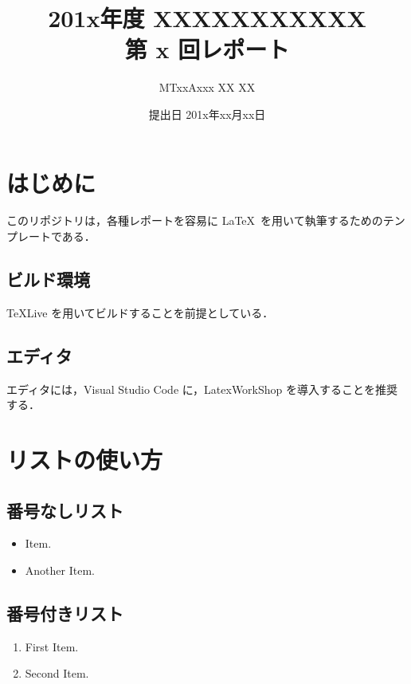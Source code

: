 \documentclass[a4j]{jsarticle}
\title{
    \vspace{-25mm}
    201x年度 XXXXXXXXXXX\\第 x 回レポート
}
\author{MTxxAxxx XX XX}
\date{提出日 201x年xx月xx日}
\begin{document}
\setcounter{page}{1}
\maketitle

\section{はじめに}
\label{cha:intro}
このリポジトリは，各種レポートを容易に \LaTeX\ を用いて執筆するためのテンプレートである．

\subsection{ビルド環境}
TeXLive \cite{TeXLive} を用いてビルドすることを前提としている．

\subsection{エディタ}
エディタには，Visual Studio Code \cite{VSCode} に，LatexWorkShop \cite{LaTeX-Workshop} を導入することを推奨する．

\section{リストの使い方}
\label{cha:list}
\subsection{番号なしリスト}
\begin{itemize}
    \item Item.
    \item Another Item.
\end{itemize}

\subsection{番号付きリスト}
\begin{enumerate}
    \item First Item.
    \item Second Item.
\end{enumerate}



\end{document}
